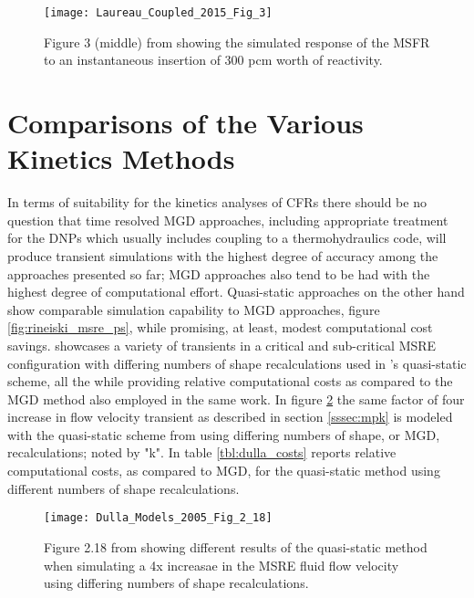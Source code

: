 \documentclass[review]{elsarticle}
\begin{document}
\begin{figure}[h]
   \centering
   \texttt{[image: Laureau\_Coupled\_2015\_Fig\_3]}
   \caption{Figure 3 (middle) from \cite{laureau_coupled_2015} showing the simulated response of
   the MSFR to an instantaneous insertion of 300 pcm worth of reactivity.} 
   \label{fig:laureau_msfr}
\end{figure}

\section{Comparisons of the Various Kinetics Methods}
\label{sec:comp}
In terms of suitability for the kinetics analyses of CFRs there should be no
question that time resolved MGD approaches, including appropriate treatment
for the DNPs which usually includes coupling to a thermohydraulics code, will
produce transient simulations with the highest degree of accuracy among the
approaches presented so far; MGD approaches also tend to be had with the highest
degree of computational effort. Quasi-static approaches on the other hand
show comparable simulation capability to MGD approaches, 
figure \ref{fig:rineiski_msre_ps},  while promising, at
least, modest computational cost savings. \cite{dulla_models_2005} showcases
a variety of transients in a critical and sub-critical MSRE configuration with
differing numbers of shape recalculations used in \cite{dulla_models_2005}'s
quasi-static scheme, all the while providing relative computational costs
 as compared to the MGD method
also employed in the same work. In figure \ref{fig:dulla_4x_qs} the same factor
of four increase in flow velocity transient as described in section
\ref{sssec:mpk} is modeled with the quasi-static scheme from
\cite{dulla_models_2005} using differing numbers of shape, or MGD,
recalculations; noted by "k". In table \ref{tbl:dulla_costs}
\cite{dulla_models_2005} reports relative computational costs, as compared to
MGD, for the quasi-static method using different numbers of shape recalculations.


\begin{figure}[h]
   \centering
   \texttt{[image: Dulla\_Models\_2005\_Fig\_2\_18]}
   \caption{Figure 2.18 from \cite{dulla_models_2005} showing different results of the
   quasi-static method when simulating a 4x increasae in the MSRE fluid flow velocity using
   differing numbers of shape recalculations.} 
   \label{fig:dulla_4x_qs}
\end{figure}
\end{document}
